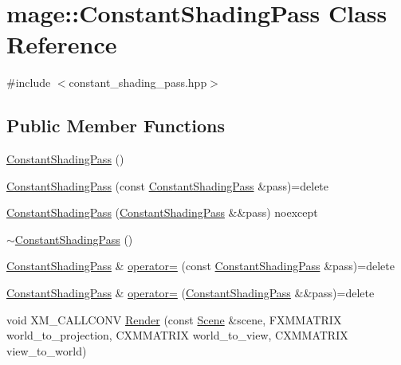 \hypertarget{classmage_1_1_constant_shading_pass}{}\section{mage\+:\+:Constant\+Shading\+Pass Class Reference}
\label{classmage_1_1_constant_shading_pass}


{\ttfamily \#include $<$constant\+\_\+shading\+\_\+pass.\+hpp$>$}

\subsection*{Public Member Functions}
\begin{DoxyCompactItemize}
\item 
\hyperlink{classmage_1_1_constant_shading_pass_a21a8614cd67999bec82d260eb9aa78d7}{Constant\+Shading\+Pass} ()
\item 
\hyperlink{classmage_1_1_constant_shading_pass_aa1f3b7bd78ba5cbd2bfd77cc8871895a}{Constant\+Shading\+Pass} (const \hyperlink{classmage_1_1_constant_shading_pass}{Constant\+Shading\+Pass} \&pass)=delete
\item 
\hyperlink{classmage_1_1_constant_shading_pass_ac613e44e8f19485a0ee0b71b4f30be91}{Constant\+Shading\+Pass} (\hyperlink{classmage_1_1_constant_shading_pass}{Constant\+Shading\+Pass} \&\&pass) noexcept
\item 
\hyperlink{classmage_1_1_constant_shading_pass_a2ef56dc45910519d5e0137b14768738e}{$\sim$\+Constant\+Shading\+Pass} ()
\item 
\hyperlink{classmage_1_1_constant_shading_pass}{Constant\+Shading\+Pass} \& \hyperlink{classmage_1_1_constant_shading_pass_ab4c547d7866d910ff0c650bf7b1e74d2}{operator=} (const \hyperlink{classmage_1_1_constant_shading_pass}{Constant\+Shading\+Pass} \&pass)=delete
\item 
\hyperlink{classmage_1_1_constant_shading_pass}{Constant\+Shading\+Pass} \& \hyperlink{classmage_1_1_constant_shading_pass_a3059d479b7cc1e42e6723bd47e4fae4e}{operator=} (\hyperlink{classmage_1_1_constant_shading_pass}{Constant\+Shading\+Pass} \&\&pass)=delete
\item 
void X\+M\+\_\+\+C\+A\+L\+L\+C\+O\+NV \hyperlink{classmage_1_1_constant_shading_pass_a22eb99196679d1b06708161458db7f7a}{Render} (const \hyperlink{classmage_1_1_scene}{Scene} \&scene, F\+X\+M\+M\+A\+T\+R\+IX world\+\_\+to\+\_\+projection, C\+X\+M\+M\+A\+T\+R\+IX world\+\_\+to\+\_\+view, C\+X\+M\+M\+A\+T\+R\+IX view\+\_\+to\+\_\+world)
\end{DoxyCompactItemize}
